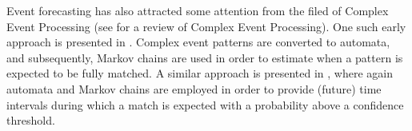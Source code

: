 \par Event forecasting has also attracted some attention from the filed of Complex Event Processing (see \cite{Cugola:2012:PFI:2187671.2187677} for a review of Complex Event Processing).
One such early approach is presented in \cite{muthusamy_predictive_2010}.
Complex event patterns are converted to automata, and subsequently,
Markov chains are used in order to estimate when a pattern is expected to be fully matched.
A similar approach is presented in \cite{alevizos2017event},
where again automata and Markov chains are employed in order to provide (future) time intervals during which a match is expected with a probability above a confidence threshold. 